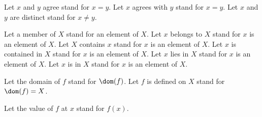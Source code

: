 


\begin{forthel}

  Let $x$ and $y$ agree stand for $x = y$.
  Let $x$ agrees with $y$ stand for $x = y$.
  Let $x$ and $y$ are distinct stand for $x \neq y$.


  Let a member of $X$ stand for an element of $X$.
  Let $x$ belongs to $X$ stand for $x$ is an element of $X$.
  Let $X$ contains $x$ stand for $x$ is an element of $X$.
  Let $x$ is contained in $X$ stand for $x$ is an element of $X$.
  Let $x$ lies in $X$ stand for $x$ is an element of $X$.
  Let $x$ is in $X$ stand for $x$ is an element of $X$.


  Let the domain of $f$ stand for $\dom(f)$.
  Let $f$ is defined on $X$ stand for $\dom(f) = X$.


  Let the value of $f$ at $x$ stand for $f(x)$.
\end{forthel}
